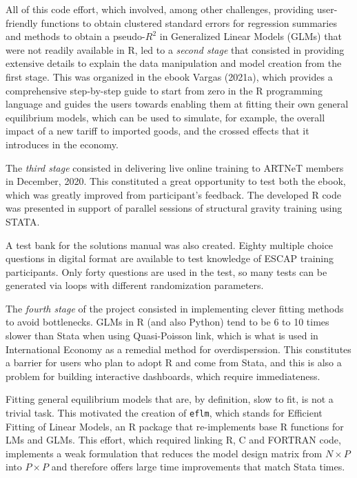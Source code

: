 \documentclass[12pt,reqno,oneside,pdftex]{formato-puc/puctesis} %
\begin{document}
All of this code effort, which involved, among other challenges,
providing user-friendly functions to obtain clustered standard errors
for regression summaries and methods to obtain a pseudo-\(R^2\) in
Generalized Linear Models (GLMs) that were not readily available in R,
led to a \emph{second stage} that consisted in providing extensive
details to explain the data manipulation and model creation from the
first stage. This was organized in the ebook Vargas (2021a), which
provides a comprehensive step-by-step guide to start from zero in the R
programming language and guides the users towards enabling them at
fitting their own general equilibrium models, which can be used to
simulate, for example, the overall impact of a new tariff to imported
goods, and the crossed effects that it introduces in the economy.

The \emph{third stage} consisted in delivering live online training to
ARTNeT members in December, 2020. This constituted a great opportunity
to test both the ebook, which was greatly improved from participant's
feedback. The developed R code was presented in support of parallel
sessions of structural gravity training using STATA.

A test bank for the solutions manual was also created. Eighty multiple
choice questions in digital format are available to test knowledge of
ESCAP training participants. Only forty questions are used in the test,
so many tests can be generated via loops with different randomization
parameters.

The \emph{fourth stage} of the project consisted in implementing clever
fitting methods to avoid bottlenecks. GLMs in R (and also Python) tend
to be 6 to 10 times slower than Stata when using Quasi-Poisson link,
which is what is used in International Economy as a remedial method for
overdisperssion. This constitutes a barrier for users who plan to adopt
R and come from Stata, and this is also a problem for building
interactive dashboards, which require immediateness.

Fitting general equilibrium models that are, by definition, slow to fit,
is not a trivial task. This motivated the creation of \texttt{eflm},
which stands for Efficient Fitting of Linear Models, an R package that
re-implements base R functions for LMs and GLMs. This effort, which
required linking R, C and FORTRAN code, implements a weak formulation
that reduces the model design matrix from \(N\times P\) into
\(P\times P\) and therefore offers large time improvements that match
Stata times.
\end{document}
